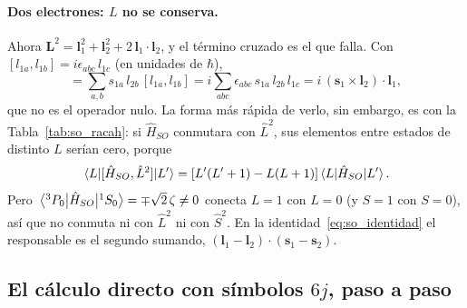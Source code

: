\documentclass[11pt,a4paper]{article}
\begin{document}
\paragraph{Dos electrones: $L$ no se conserva.} Ahora $\mathbf{L}^2 = \mathbf{l}_1^2 + \mathbf{l}_2^2 +
2\,\mathbf{l}_1\cdot\mathbf{l}_2$, y el término cruzado es el que falla. Con
$[l_{1a}, l_{1b}] = i\epsilon_{abc}\,l_{1c}$ (en unidades de $\hbar$),
\begin{equation}
  [\mathbf{l}_1\cdot\mathbf{s}_1,\ \mathbf{l}_1\cdot\mathbf{l}_2]
  = \sum_{a,b} s_{1a}\,l_{2b}\,[l_{1a}, l_{1b}]
  = i \sum_{abc}\epsilon_{abc}\,s_{1a}\,l_{2b}\,l_{1c}
  = i\,(\mathbf{s}_1\times\mathbf{l}_2)\cdot\mathbf{l}_1 ,
\end{equation}
que no es el operador nulo. La forma más rápida de verlo, sin embargo, es con la
Tabla~\ref{tab:so_racah}: si $\hat{H}_{SO}$ conmutara con $\hat{L}^2$, sus elementos entre estados
de distinto $L$ serían cero, porque
\begin{equation*}
  \mel{L}{[\hat{H}_{SO},\hat{L}^2]}{L'} = [L'(L'+1) - L(L+1)]\mel{L}{\hat{H}_{SO}}{L'} .
\end{equation*}
Pero
$\mel{^3P_0}{\hat{H}_{SO}}{^1S_0} = \mp\sqrt{2}\,\zeta \neq 0$ conecta $L=1$ con $L=0$ (y $S=1$
con $S=0$), así que no conmuta ni con $\hat{L}^2$ ni con $\hat{S}^2$. En la identidad~\eqref{eq:so_identidad}
el responsable es el segundo sumando, $(\mathbf{l}_1-\mathbf{l}_2)\cdot(\mathbf{s}_1-\mathbf{s}_2)$.

\subsection{El cálculo directo con símbolos \texorpdfstring{$6j$}{6j}, paso a paso}
\end{document}
